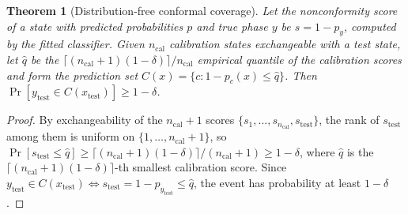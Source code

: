 \documentclass[aps,prresearch,reprint,amsmath,amssymb,nofootinbib,superscriptaddress,floatfix]{revtex4-2}
\newtheorem{theorem}{Theorem}
\theoremstyle{definition}
\theoremstyle{remark}
\theoremstyle{plain}
\begin{document}
\begin{theorem}[Distribution-free conformal coverage]
\label{thm:conformal}
Let the nonconformity score of a state with predicted probabilities $p$ and true phase $y$ be $s=1-p_y$,
computed by the fitted classifier. Given $n_{\mathrm{cal}}$ calibration states exchangeable with a test
state, let $\hat q$ be the $\lceil(n_{\mathrm{cal}}+1)(1-\delta)\rceil/n_{\mathrm{cal}}$ empirical quantile
of the calibration scores and form the prediction set $C(x)=\{c:1-p_c(x)\le\hat q\}$. Then
$\Pr[y_{\mathrm{test}}\in C(x_{\mathrm{test}})]\ge1-\delta$.
\end{theorem}
\begin{proof}
By exchangeability of the $n_{\mathrm{cal}}+1$ scores
$\{s_1,\dots,s_{n_{\mathrm{cal}}},s_{\mathrm{test}}\}$, the rank of $s_{\mathrm{test}}$ among them is
uniform on $\{1,\dots,n_{\mathrm{cal}}+1\}$, so $\Pr[s_{\mathrm{test}}\le\hat q]\ge
\lceil(n_{\mathrm{cal}}+1)(1-\delta)\rceil/(n_{\mathrm{cal}}+1)\ge1-\delta$, where $\hat q$ is the
$\lceil(n_{\mathrm{cal}}+1)(1-\delta)\rceil$-th smallest calibration score. Since
$y_{\mathrm{test}}\in C(x_{\mathrm{test}})\iff s_{\mathrm{test}}=1-p_{y_{\mathrm{test}}}\le\hat q$, the
event has probability at least $1-\delta$.
\end{proof}
\end{document}
